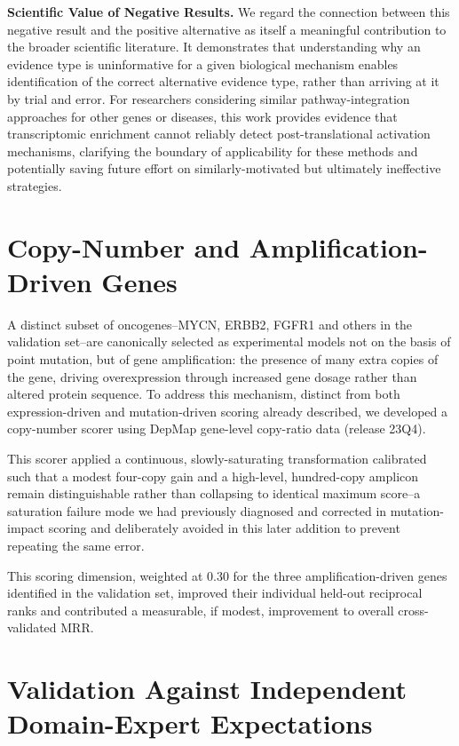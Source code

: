 \documentclass[author={Karen Coutinho, Ishaan Bhalla, Aman Raj, Dixit Kaloorani Malarmannan},
                supervisor={Dr. Daniel D'Andrea},
                degree={MSc},
                title={CellSelector Omics: A Multi-Omics Recommendation System for Cell Line Selection},
                subtitle={},
                type={},
                year={2026}]{dissertation}
\begin{document}
{\bf Scientific Value of Negative Results.} We regard the connection between this negative result and the positive alternative as itself a meaningful contribution to the broader scientific literature. It demonstrates that understanding why an evidence type is uninformative for a given biological mechanism enables identification of the correct alternative evidence type, rather than arriving at it by trial and error. For researchers considering similar pathway-integration approaches for other genes or diseases, this work provides evidence that transcriptomic enrichment cannot reliably detect post-translational activation mechanisms, clarifying the boundary of applicability for these methods and potentially saving future effort on similarly-motivated but ultimately ineffective strategies.

\section{Copy-Number and Amplification-Driven Genes}

A distinct subset of oncogenes--MYCN, ERBB2, FGFR1 and others in the validation set--are canonically selected as experimental models not on the basis of point mutation, but of gene amplification: the presence of many extra copies of the gene, driving overexpression through increased gene dosage rather than altered protein sequence. To address this mechanism, distinct from both expression-driven and mutation-driven scoring already described, we developed a copy-number scorer using DepMap gene-level copy-ratio data (release 23Q4).

This scorer applied a continuous, slowly-saturating transformation calibrated such that a modest four-copy gain and a high-level, hundred-copy amplicon remain distinguishable rather than collapsing to identical maximum score--a saturation failure mode we had previously diagnosed and corrected in mutation-impact scoring and deliberately avoided in this later addition to prevent repeating the same error.

This scoring dimension, weighted at 0.30 for the three amplification-driven genes identified in the validation set, improved their individual held-out reciprocal ranks and contributed a measurable, if modest, improvement to overall cross-validated MRR.

\section{Validation Against Independent Domain-Expert Expectations}
\end{document}
